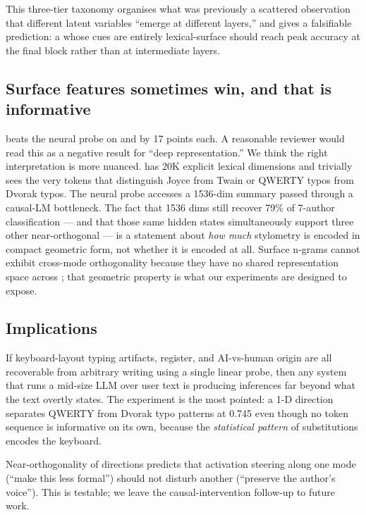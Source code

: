 This three-tier taxonomy organises what was previously a scattered observation that different latent variables ``emerge at different layers,'' and gives a falsifiable prediction: a \modes whose cues are entirely lexical-surface should reach peak accuracy at the final block rather than at intermediate layers.

\subsection{Surface features sometimes win, and that is informative}

\tfidf beats the neural probe on \authorship and \typo by 17 points each. A reasonable reviewer would read this as a negative result for ``deep representation.'' We think the right interpretation is more nuanced. \tfidf has 20K explicit lexical dimensions and trivially sees the very tokens that distinguish Joyce from Twain or QWERTY typos from Dvorak typos. The neural probe accesses a 1536-dim summary passed through a causal-LM bottleneck. The fact that 1536 dims still recover 79\% of 7-author classification --- and that those same hidden states simultaneously support three other near-orthogonal \modes --- is a statement about \emph{how much} stylometry is encoded in compact geometric form, not whether it is encoded at all. Surface n-grams cannot exhibit cross-mode orthogonality because they have no shared representation space across \modes; that geometric property is what our experiments are designed to expose.

\subsection{Implications}

 If keyboard-layout typing artifacts, register, and AI-vs-human origin are all recoverable from arbitrary writing using a single linear probe, then any system that runs a mid-size LLM over user text is producing inferences far beyond what the text overtly states. The \typo experiment is the most pointed: a 1-D direction separates QWERTY from Dvorak typo patterns at 0.745 even though no token sequence is informative on its own, because the \emph{statistical pattern} of substitutions encodes the keyboard.

 Near-orthogonality of \modes directions predicts that activation steering along one mode (\eg ``make this less formal'') should not disturb another (\eg ``preserve the author's voice''). This is testable; we leave the causal-intervention follow-up to future work.

